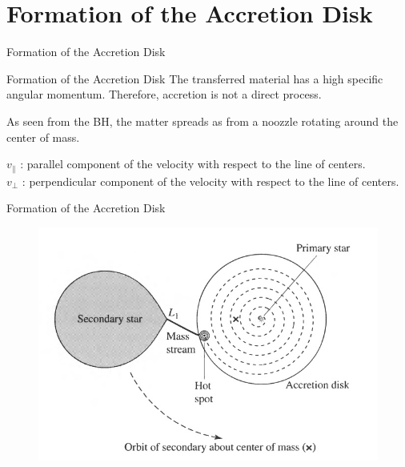 \documentclass{beamer}
\begin{document}
\section{Formation of the Accretion Disk}    
\begin{darkframes}

\begin{frame}
\Huge
Formation of the Accretion Disk
\end{frame}

\begin{frame}{Formation of the Accretion Disk}
	The transferred material has a high specific angular momentum. Therefore, accretion is not a direct process.\\
	\pause
	
	As seen from the BH, the matter spreads as from a noozzle rotating around the center of mass.\\
	\pause
	\bigskip
	
	$v_\parallel $ : parallel component of the velocity with respect to the line of centers.\\
	$v_\perp $ : perpendicular component of the velocity with respect to the line of centers.
\end{frame}

\end{darkframes}

\begin{frame}{Formation of the Accretion Disk}
	\begin{center}
      \begin{figure}
      	\includegraphics[scale=0.4] {figures/diskFormation.jpeg}
      \end{figure}
	\end{center}	
\end{frame}
\end{document}
